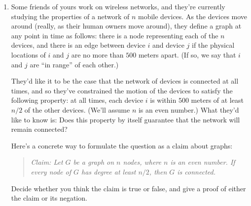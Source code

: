 \documentclass[12pt]{article}
\begin{document}
\begin{enumerate}


\item

Some friends of yours work on wireless networks,
and they're currently studying the properties of a
network of $n$ mobile devices.
As the devices move around (really, as their human owners move around),
they define a graph at any point in time as follows:
there is a node representing each of the $n$ devices, and
there is an edge between device $i$ and device $j$
if the physical locations of $i$ and $j$
are no more than $500$ meters apart.
(If so, we say that $i$ and $j$ are ``in range'' of each other.)

They'd like it to be the case that the network of devices
is connected at all times, and so they've constrained
the motion of the devices to satisfy the following property:
at all times, each device $i$ is within $500$ meters of at
least $n/2$ of the other devices.
(We'll assume $n$ is an even number.)
What they'd like to know is: Does this property by itself
guarantee that the network will remain connected?

Here's a concrete way to formulate the question as
a claim about graphs:
\begin{quote}
{\em Claim: Let $G$ be a graph on $n$ nodes, where $n$
is an even number.  If every node of $G$ has degree at least $n/2$,
then $G$ is connected.}
\end{quote}
Decide whether you think the claim is true or false,
and give a proof of either the claim or its negation.


\end{enumerate}
\end{document}
